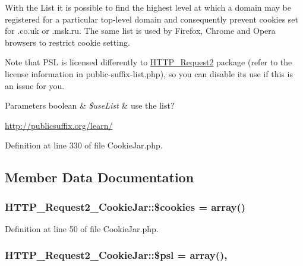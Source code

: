 With the List it is possible to find the highest level at which a domain may be registered for a particular top-\/level domain and consequently prevent cookies set for \textquotesingle{}.co.\+uk\textquotesingle{} or \textquotesingle{}.msk.\+ru\textquotesingle{}. The same list is used by Firefox, Chrome and Opera browsers to restrict cookie setting.

Note that P\+SL is licensed differently to \hyperlink{classHTTP__Request2}{H\+T\+T\+P\+\_\+\+Request2} package (refer to the license information in public-\/suffix-\/list.\+php), so you can disable its use if this is an issue for you.


\begin{DoxyParams}[1]{Parameters}
boolean & {\em \$use\+List} & use the list?\\
\hline
\end{DoxyParams}
\hyperlink{}{http\+://publicsuffix.\+org/learn/}

Definition at line 330 of file Cookie\+Jar.\+php.



\subsection{Member Data Documentation}
\subsubsection[{\texorpdfstring{\$cookies}{$cookies}}]{\setlength{\rightskip}{0pt plus 5cm}H\+T\+T\+P\+\_\+\+Request2\+\_\+\+Cookie\+Jar\+::\$cookies = array()\hspace{0.3cm}{\ttfamily [protected]}}\hypertarget{classHTTP__Request2__CookieJar_ab7bfdc0aa06d9b09b8050cfbdb1afacf}{}\label{classHTTP__Request2__CookieJar_ab7bfdc0aa06d9b09b8050cfbdb1afacf}


Definition at line 50 of file Cookie\+Jar.\+php.

\subsubsection[{\texorpdfstring{\$psl}{$psl}}]{\setlength{\rightskip}{0pt plus 5cm}H\+T\+T\+P\+\_\+\+Request2\+\_\+\+Cookie\+Jar\+::\$psl = array()\hspace{0.3cm}{\ttfamily [static]}, {\ttfamily [protected]}}\hypertarget{classHTTP__Request2__CookieJar_a3ff030e15c5780c2812814e8e7d3131d}{}\label{classHTTP__Request2__CookieJar_a3ff030e15c5780c2812814e8e7d3131d}


